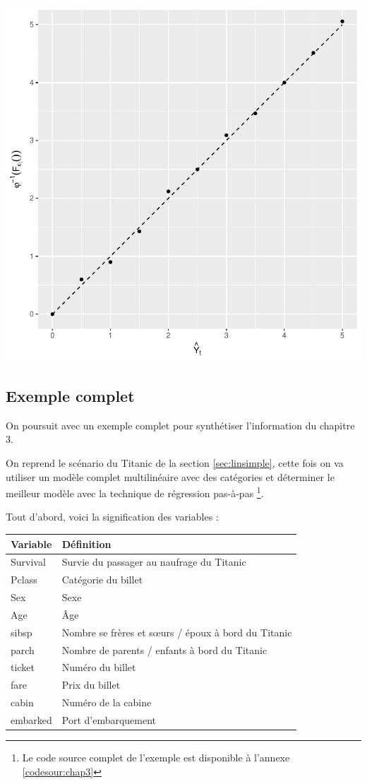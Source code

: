 \documentclass[11pt,french]{report}
\begin{document}
\includegraphics{notes_de_cours-035}

\subsection{Exemple complet}
\label{ex:chapitre3}

On poursuit avec un exemple complet pour synthétiser l'information du chapitre 3. \newline

On reprend le scénario du Titanic de la section \ref{sec:linsimple}, cette fois on va utiliser un modèle complet multilinéaire avec des catégories et déterminer le meilleur modèle avec la technique de régression pas-à-pas \footnote{Le code source complet de l'exemple est disponible à l'annexe \ref{codesour:chap3}}.  \newline

Tout d'abord, voici la signification des variables :
\begin{center}
\begin{tabularx}{\textwidth}{XX}
\hline
Variable & Définition \\
\hline
Survival & Survie du passager au naufrage du Titanic \\
Pclass & Catégorie du billet \\
Sex & Sexe \\
Age & Âge \\
sibsp & Nombre se frères et sœurs / époux à bord du Titanic \\
parch & Nombre de parents / enfants à bord du Titanic \\
ticket & Numéro du billet \\
fare & Prix du billet \\
cabin & Numéro de la cabine \\
embarked & Port d'embarquement \\
\hline
\end{tabularx}
\end{center}
\end{document}
